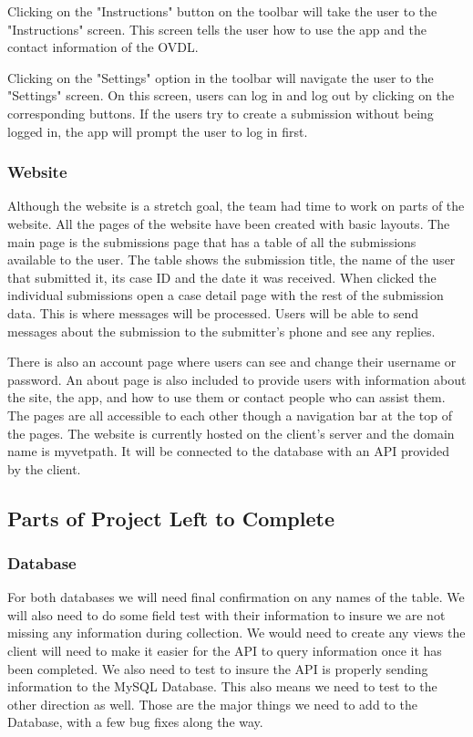 \documentclass[onecolumn, draftclsnofoot,10pt, compsoc]{IEEEtran}
\begin{document}
Clicking on the "Instructions" button on the toolbar will take the user to the "Instructions" screen. This screen tells the user how to use the app and the contact information of the OVDL.

Clicking on the "Settings" option in the toolbar will navigate the user to the "Settings" screen. On this screen, users can log in and log out by clicking on the corresponding buttons. If the users try to create a submission without being logged in, the app will prompt the user to log in first. 

\subsubsection{Website}
Although the website is a stretch goal, the team had time to work on parts of the website. All the pages of the website have been created with basic layouts. The main page is the submissions page that has a table of all the submissions available to the user. The table shows the submission title, the name of the user that submitted it, its case ID and the date it was received. When clicked the individual submissions open a case detail page with the rest of the submission data. This is where messages will be processed. Users will be able to send messages about the submission to the submitter's phone and see any replies. 

There is also an account page where users can see and change their username or password. An about page is also included to provide users with information about the site, the app, and how to use them or contact people who can assist them. The pages are all accessible to each other though a navigation bar at the top of the pages. The website is currently hosted on the client's server and the domain name is myvetpath. It will be connected to the database with an API provided by the client. 


\subsection{Parts of Project Left to Complete}
\subsubsection{Database}
For both databases we will need final confirmation on any names of the table. We will also need to do some field test with their information to insure we are not missing any information during collection. We would need to create any views the client will need to make it easier for the API to query information once it has been completed. We also need to test to insure the API is properly sending information to the MySQL Database. This also means we need to test to the other direction as well. Those are the major things we need to add to the Database, with a few bug fixes along the way. 
\end{document}
